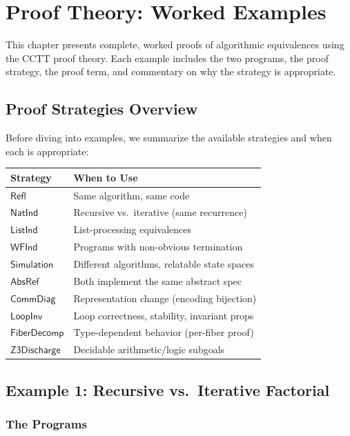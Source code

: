 
\chapter{Proof Theory: Worked Examples}
\label{ch:proof-theory-examples}

This chapter presents complete, worked proofs of algorithmic equivalences
using the CCTT proof theory.  Each example includes the two programs,
the proof strategy, the proof term, and commentary on why the strategy
is appropriate.

\section{Proof Strategies Overview}

Before diving into examples, we summarize the available strategies
and when each is appropriate:

\begin{longtable}{lp{8cm}}
\toprule
\textbf{Strategy} & \textbf{When to Use} \\
\midrule
$\mathsf{Refl}$ & Same algorithm, same code \\
$\mathsf{NatInd}$ & Recursive vs.\ iterative (same recurrence) \\
$\mathsf{ListInd}$ & List-processing equivalences \\
$\mathsf{WFInd}$ & Programs with non-obvious termination \\
$\mathsf{Simulation}$ & Different algorithms, relatable state spaces \\
$\mathsf{AbsRef}$ & Both implement the same abstract spec \\
$\mathsf{CommDiag}$ & Representation change (encoding bijection) \\
$\mathsf{LoopInv}$ & Loop correctness, stability, invariant props \\
$\mathsf{FiberDecomp}$ & Type-dependent behavior (per-fiber proof) \\
$\mathsf{Z3Discharge}$ & Decidable arithmetic/logic subgoals \\
\bottomrule
\end{longtable}


\section{Example 1: Recursive vs.\ Iterative Factorial}

\subsection{The Programs}

